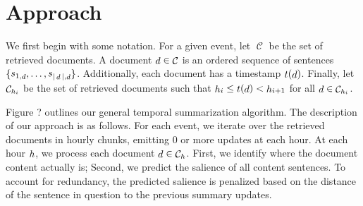 \documentclass{sig-alternate}
\DeclareMathOperator{\corpus}{\mathcal{C}}
\DeclareMathOperator{\doc}{\mathnormal{d}}
\DeclareMathOperator{\sent}{\mathnormal{s}}
\DeclareMathOperator{\dtime}{\mathnormal{t}}
\DeclareMathOperator{\hour}{\mathnormal{h}}
\begin{document}
%
%
%
%



\section{Approach}\label{sec:approach}


We first begin with some notation. For a given event, let $\corpus$ be the set
of retrieved documents. A document $\doc \in \corpus$ is an ordered sequence
of sentences $\{\sent_{1,\doc},\ldots,\sent_{|\doc|,\doc} \}$. 
Additionally, each document has a timestamp $\dtime(\doc)$. Finally, let 
$\corpus_{\hour_i}$ be the set of retrieved documents such that 
$\hour_i \le \dtime(\doc) < \hour_{i+1}$ for all $\doc \in \corpus_{\hour_i}$.

Figure ? outlines our general temporal summarization algorithm. The description
of our approach is as follows.
For each event, we iterate over the retrieved 
documents in hourly chunks, emitting 0 or more updates at each hour.
At each hour $\hour$, we process each document
$\doc \in \corpus_{\hour}$. First, we identify where the document content
actually is; Second, we predict the salience of all content sentences.
To account for redundancy, the predicted salience is penalized based on the 
distance of the sentence in question to the previous summary updates.
\end{document}
